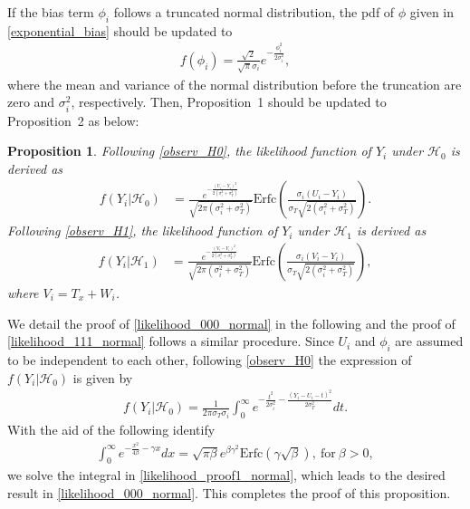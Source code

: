 \documentclass[journal]{IEEEtran}
\newcommand{\Hnull}{\mathcal{H}_0}
\newcommand{\Halt}{\mathcal{H}_1}
\newtheorem{proposition}{\noindent \textbf{Proposition}}
\begin{document}
If the bias term $\phi_i$ follows a truncated normal distribution, the pdf of $\phi$ given in \eqref{exponential_bias} should be updated to
\begin{align}
f(\phi_i) = \frac{\sqrt{2}}{\sqrt{\pi} \sigma_i}e^{-\frac{\phi_i^2}{2 \sigma_i^2}},
\end{align}
where the mean and variance of the normal distribution before the truncation are zero and $\sigma_i^2$, respectively. Then, Proposition~1 should be updated to Proposition~2 as below:
\begin{proposition}\label{proposition2}
Following \eqref{observ_H0}, the likelihood function of $Y_i$ under $\Hnull$ is derived as
\begin{align}\label{likelihood_000_normal}
f(Y_i|\Hnull) &= \frac{e^{-\frac{(U_i - Y_i)^2}{2(\sigma_i^2 + \sigma_T^2)}}}{\sqrt{2 \pi (\sigma_i^2 + \sigma_T^2)}}\text{Erfc}\left(\frac{\sigma_i(U_i - Y_i)}{\sigma_T \sqrt{2(\sigma_i^2 + \sigma_T^2)}}\right).
\end{align}
Following \eqref{observ_H1}, the likelihood function of $Y_i$ under $\Halt$ is derived as
\begin{align}\label{likelihood_111_normal}
f(Y_i|\Halt) &= \frac{e^{-\frac{(V_i - Y_i)^2}{2(\sigma_i^2 + \sigma_T^2)}}}{\sqrt{2 \pi (\sigma_i^2 + \sigma_T^2)}}\text{Erfc}\left(\frac{\sigma_i(V_i - Y_i)}{\sigma_T \sqrt{2(\sigma_i^2 + \sigma_T^2)}}\right),
\end{align}
where $V_i = T_x + W_i$.
\end{proposition}
\begin{IEEEproof}
We detail the proof of \eqref{likelihood_000_normal} in the following and the proof of \eqref{likelihood_111_normal} follows a similar procedure.
Since $U_i$ and $\phi_i$ are assumed to be independent to each other, following \eqref{observ_H0} the expression of $f(Y_i|\Hnull)$ is given by
\begin{align}\label{likelihood_proof1_normal}
f(Y_i|\Hnull) = \frac{1}{2 \pi \sigma_T \sigma_i}\int_{0}^{\infty}e^{-\frac{t^2}{2\sigma_i^2} - \frac{(Y_i - U_i - t)^2}{2 \sigma_T^2}} dt.
\end{align}
With the aid of the following identify \cite[Eq. (3.322.2)]{gradshteuin2007table}
\begin{align}
\int_0^{\infty} e^{-\frac{x^2}{4 \beta}-\gamma x} dx = \sqrt{\pi \beta} e^{\beta \gamma^2}\text{Erfc}(\gamma \sqrt{\beta}), ~\text{for}~\beta > 0,
\end{align}
we solve the integral in \eqref{likelihood_proof1_normal}, which leads to the desired result in \eqref{likelihood_000_normal}. This completes the proof of this proposition.
\end{IEEEproof}
\end{document}

